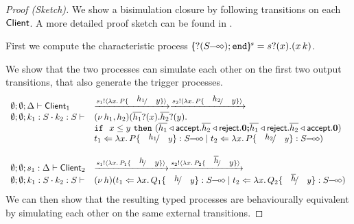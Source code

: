 \begin{proof}[Proof (Sketch)]
	\noi We show a bisimulation closure by following transitions on each $\mathsf{Client}$.
	A more detailed proof sketch can be found in .

	\noi First we compute the characteristic process
	$\mapchar{\btinp{\lhot{S}} \tinact}{s} = \binp{s}{x} (\appl{x}{k})$.

	\noi We show that the two processes can simulate each other on
	the first two output transitions, that also generate the trigger
	processes.
%
\[
	\begin{array}{ll}
		\es; \es; \Delta \proves \Client_1
		&
		\by{\bactout{s_1}{\abs{x}{P \subst{h_1}{y}}}}
		\by{\bactout{s_2}{\abs{x}{P \subst{h_2}{y}}}}
		\\
		\es; \es; k_1: S \cat k_2: S \proves
		&
		\newsp{h_1, h_2}{\binp{\dual{h_1}}{x} \binp{\dual{h_2}}{y}\\
		& \If\ x \leq y\ \Then (\bsel{\dual{h_1}}{\accept} \bsel{\dual{h_2}}{\reject} \inact
		\Else \bsel{\dual{h_1}}{\reject} \bsel{\dual{h_2}}{\accept} \inact)\\
		& \ftrigger{t_1}{\abs{x}{P \subst{h_1}{y}}}{\lhot{S}} \Par \ftrigger{t_2}{\abs{x}{P \subst{h_2}{y}}}{\lhot{S}}}
		\\
		\\
		\es; \es; s_1: \Delta \proves \Client_2
		&\by{\bactout{s_1}{\abs{x}{P_1 \subst{h}{y}}}}
		\by{\bactout{s_2}{\abs{x}{P_2 \subst{\dual{h}}{y}}}}
		\\
		\es; \es; k_1: S \cat k_2: S \proves & \newsp{h}{
		\ftrigger{t_1}{\abs{x}{Q_1 \subst{h}{y}}}{\lhot{S}} \Par \ftrigger{t_2}{\abs{x}{Q_2 \subst{\dual{h}}{y}}}{\lhot{S}}}
	\end{array}
\]
	\noi We can then show that the resulting typed processes
	are behaviourally equivalent by simulating each other on the same external transitions.
\end{proof}

